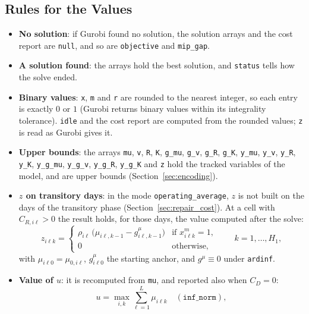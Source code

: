 \subsection{Rules for the Values}

\begin{itemize}[nosep,leftmargin=1.5em]
  \item \textbf{No solution}: if Gurobi found no solution, the solution arrays and the cost report are \texttt{null}, and so are \texttt{objective} and \texttt{mip\_gap}.
  \item \textbf{A solution found}: the arrays hold the best solution, and \texttt{status} tells how the solve ended.
  \item \textbf{Binary values}: \texttt{x}, \texttt{m} and \texttt{r} are rounded to the nearest integer, so each entry is exactly $0$ or $1$ (Gurobi returns binary values within its integrality tolerance). \texttt{idle} and the cost report are computed from the rounded values; \texttt{z} is read as Gurobi gives it.
  \item \textbf{Upper bounds}: the arrays \texttt{mu}, \texttt{v}, \texttt{R}, \texttt{K}, \texttt{g\_mu}, \texttt{g\_v}, \texttt{g\_R}, \texttt{g\_K}, \texttt{y\_mu}, \texttt{y\_v}, \texttt{y\_R}, \texttt{y\_K}, \texttt{y\_g\_mu}, \texttt{y\_g\_v}, \texttt{y\_g\_R}, \texttt{y\_g\_K} and \texttt{z} hold the tracked variables of the model, and are upper bounds (Section~\ref{sec:encoding}).
  \item \textbf{$z$ on transitory days}: in the mode \texttt{operating\_average}, $z$ is not built on the days of the transitory phase (Section~\ref{sec:repair_cost}). At a cell with $C_{R,i\ell} > 0$ the result holds, for those days, the value computed after the solve:
  \begin{equation}\label{eq:c_zpost}
    z_{i\ell k} = \begin{cases}
      \rho_{i\ell}\,\bigl(\mu_{i\ell,k-1} - g^{\mu}_{i\ell,k-1}\bigr) & \text{if } x^m_{i\ell k} = 1,\\
      0 & \text{otherwise,}
    \end{cases}
    \qquad k = 1, \ldots, H_1,
  \end{equation}
  with $\mu_{i\ell 0} = \mu_{0,i\ell}$, $g^{\mu}_{i\ell 0}$ the starting anchor, and $g^{\mu} \equiv 0$ under \texttt{ardinf}.
  \item \textbf{Value of $u$}: it is recomputed from \texttt{mu}, and reported also when $C_D = 0$:
  \begin{equation}\label{eq:c_u}
    u = \max_{i,k} \sum_{\ell=1}^{L} \mu_{i\ell k} \quad (\texttt{inf\_norm}),

\end{equation}
\end{itemize}
